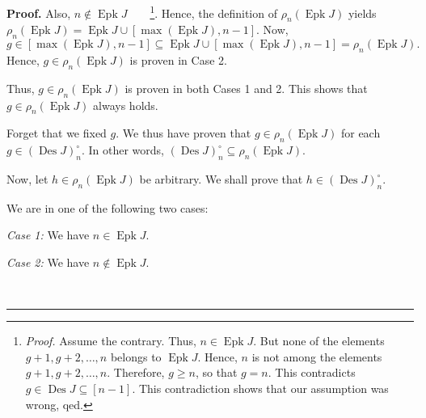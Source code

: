 \documentclass[numbers=enddot,12pt,final,onecolumn,notitlepage]{scrartcl}%
\theoremstyle{definition}
\newenvironment{proof}[1][Proof]{\noindent\textbf{#1.} }{\ \rule{0.5em}{0.5em}}
\newenvironment{verlong}{}{}
\begin{document}
\begin{verlong}
\begin{proof}
Also, $n\notin\operatorname*{Epk}J$\ \ \ \ \footnote{\textit{Proof.} Assume
the contrary. Thus, $n\in\operatorname*{Epk}J$. But none of the elements
$g+1,g+2,\ldots,n$ belongs to $\operatorname*{Epk}J$. Hence, $n$ is not among
the elements $g+1,g+2,\ldots,n$. Therefore, $g\geq n$, so that $g=n$. This
contradicts $g\in\operatorname*{Des}J\subseteq\left[  n-1\right]  $. This
contradiction shows that our assumption was wrong, qed.}. Hence, the
definition of $\rho_{n}\left(  \operatorname*{Epk}J\right)  $ yields $\rho
_{n}\left(  \operatorname*{Epk}J\right)  =\operatorname*{Epk}J\cup\left[
\max\left(  \operatorname*{Epk}J\right)  ,n-1\right]  $. Now,%
\[
g\in\left[  \max\left(  \operatorname*{Epk}J\right)  ,n-1\right]
\subseteq\operatorname*{Epk}J\cup\left[  \max\left(  \operatorname*{Epk}%
J\right)  ,n-1\right]  =\rho_{n}\left(  \operatorname*{Epk}J\right)  .
\]
Hence, $g\in\rho_{n}\left(  \operatorname*{Epk}J\right)  $ is proven in Case 2.

Thus, $g\in\rho_{n}\left(  \operatorname*{Epk}J\right)  $ is proven in both
Cases 1 and 2. This shows that $g\in\rho_{n}\left(  \operatorname*{Epk}%
J\right)  $ always holds.

Forget that we fixed $g$. We thus have proven that $g\in\rho_{n}\left(
\operatorname*{Epk}J\right)  $ for each $g\in\left(  \operatorname*{Des}%
J\right)  _{n}^{\circ}$. In other words, $\left(  \operatorname*{Des}J\right)
_{n}^{\circ}\subseteq\rho_{n}\left(  \operatorname*{Epk}J\right)  $.

Now, let $h\in\rho_{n}\left(  \operatorname*{Epk}J\right)  $ be arbitrary. We
shall prove that $h\in\left(  \operatorname*{Des}J\right)  _{n}^{\circ}$.

We are in one of the following two cases:

\textit{Case 1:} We have $n\in\operatorname*{Epk}J$.

\textit{Case 2:} We have $n\notin\operatorname*{Epk}J$.


\end{proof}
\end{verlong}
\end{document}
